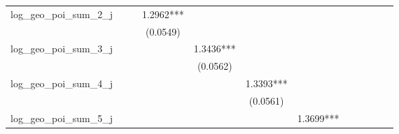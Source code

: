 \begin{table}
\begin{center}
\begin{tabular}{lccccccccccc}
log\_geo\_poi\_sum\_2\_j        &                       &                        & 1.2962***               &                          &                           &                            &                             &                              &                               &                                &                                  \\
                                &                       &                        & (0.0549)                &                          &                           &                            &                             &                              &                               &                                &                                  \\
log\_geo\_poi\_sum\_3\_j        &                       &                        &                         & 1.3436***                &                           &                            &                             &                              &                               &                                &                                  \\
                                &                       &                        &                         & (0.0562)                 &                           &                            &                             &                              &                               &                                &                                  \\
log\_geo\_poi\_sum\_4\_j        &                       &                        &                         &                          & 1.3393***                 &                            &                             &                              &                               &                                &                                  \\
                                &                       &                        &                         &                          & (0.0561)                  &                            &                             &                              &                               &                                &                                  \\
log\_geo\_poi\_sum\_5\_j        &                       &                        &                         &                          &                           & 1.3699***                  &                             &                              &                               &                                &                                  \\

\end{tabular}
\end{center}
\end{table}

